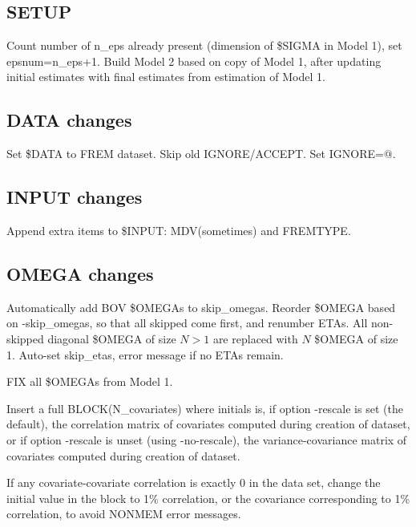 \subsection{SETUP}
Count number of n\_eps already present (dimension of \$SIGMA in Model 1), set epsnum=n\_eps+1.
Build Model 2 based on copy of Model 1, after updating initial estimates with final estimates
from estimation of Model 1.

\subsection{DATA changes}
Set \$DATA to FREM dataset. Skip old IGNORE/ACCEPT. Set IGNORE=@.

\subsection{INPUT changes}
Append extra items to \$INPUT: MDV(sometimes) and FREMTYPE.

\subsection{OMEGA changes}
Automatically add BOV \$OMEGAs to skip\_omegas.
Reorder \$OMEGA based on -skip\_omegas, so that all skipped come first, and renumber ETAs.
All non-skipped diagonal \$OMEGA of size $N>1$
are replaced with $N$ \$OMEGA of size 1.
Auto-set skip\_etas, error message if no ETAs remain.

FIX all \$OMEGAs from Model 1.

Insert
a full BLOCK(N\_covariates) where initials is,
if option -rescale is set (the default), the correlation matrix of covariates computed during
creation of dataset, or if option -rescale is unset (using -no-rescale),
the variance-covariance matrix of covariates computed during creation of dataset.

If any covariate-covariate correlation is exactly 0 in the data set, change the initial
value in the block to 1\% correlation, or the covariance corresponding to 1\% correlation,
to avoid NONMEM error messages.


